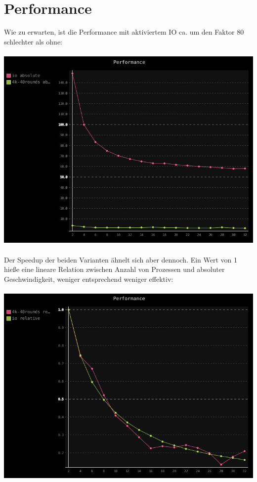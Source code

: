 \section{Performance}
Wie zu erwarten, ist die Performance mit aktiviertem IO ca. um den Faktor 80 schlechter als ohne: \\
\\
\includegraphics[scale=0.52]{pics/io-vs-no-io-abs.jpg}
\quad \\ \\
Der Speedup der beiden Varianten ähnelt sich aber dennoch.
Ein Wert von 1 hieße eine lineare Relation zwischen Anzahl von Prozessen und absoluter Geschwindigkeit,
weniger entsprechend weniger effektiv: \\ \\
\includegraphics[scale=0.52]{pics/io-vs-no-io-rel.jpg}
